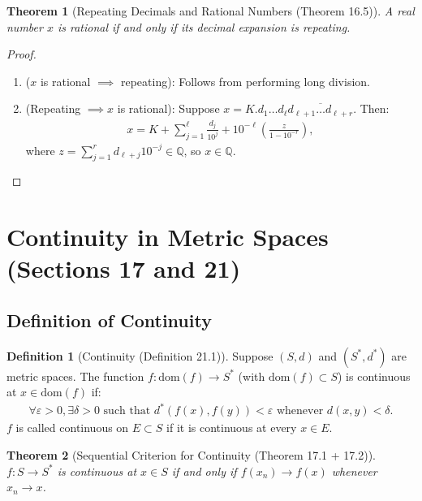 \documentclass[9pt]{article}
\theoremstyle{definition}
\newtheorem{definition}{Definition}
\theoremstyle{plain}
\newtheorem{theorem}{Theorem}
\begin{document}
\begin{theorem}[Repeating Decimals and Rational Numbers (Theorem 16.5)]
A real number $ x $ is rational if and only if its decimal expansion is repeating.
\end{theorem}

\begin{proof}

\begin{enumerate}
    \item ($ x $ is rational $ \implies $ repeating): Follows from performing long division.
    \item (Repeating $ \implies x $ is rational): Suppose $ x = K .d_1 \ldots d_\ell \overline{d_{\ell+1} \ldots d_{\ell+r}} $. Then:
    \begin{align}
    x = K + \sum_{j=1}^\ell \frac{d_j}{10^j} + 10^{-\ell} \left( \frac{z}{1 - 10^{-r}} \right),
    \end{align}
    where $ z = \sum_{j=1}^r d_{\ell+j} 10^{-j} \in \mathbb{Q} $, so $ x \in \mathbb{Q} $.
\end{enumerate}
\end{proof}
\section*{Continuity in Metric Spaces (Sections 17 and 21)}

\subsection*{Definition of Continuity}
\begin{definition}[Continuity (Definition 21.1)]
Suppose $ (S, d) $ and $ (S^*, d^*) $ are metric spaces. The function $ f : \text{dom}(f) \to S^* $ (with $ \text{dom}(f) \subset S $) is continuous at $ x \in \text{dom}(f) $ if:
\begin{align}
\forall \varepsilon > 0, \exists \delta > 0 \text{ such that } d^*(f(x), f(y)) < \varepsilon \text{ whenever } d(x, y) < \delta.
\end{align}
$ f $ is called continuous on $ E \subset S $ if it is continuous at every $ x \in E $.
\end{definition}

\begin{theorem}[Sequential Criterion for Continuity (Theorem 17.1 + 17.2)]
$ f : S \to S^* $ is continuous at $ x \in S $ if and only if $ f(x_n) \to f(x) $ whenever $ x_n \to x $.
\end{theorem}
\end{document}
